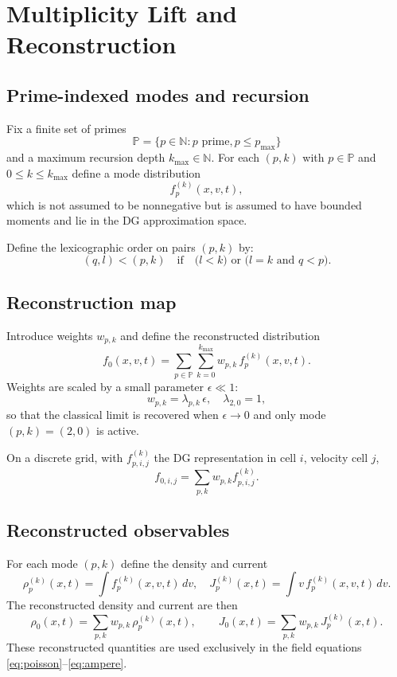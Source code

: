 \documentclass[11pt]{article}
\begin{document}
\section{Multiplicity Lift and Reconstruction}

\subsection{Prime-indexed modes and recursion}

Fix a finite set of primes
\[
  \mathbb{P} = \{p \in \mathbb{N} : p \text{ prime}, p \le p_{\max}\}
\]
and a maximum recursion depth $k_{\max}\in\mathbb{N}$.
For each $(p,k)$ with $p\in\mathbb{P}$ and $0\le k\le k_{\max}$ define a mode
distribution
\[
  f_p^{(k)}(x,v,t),
\]
which is not assumed to be nonnegative but is assumed to have bounded moments
and lie in the DG approximation space.

Define the lexicographic order on pairs $(p,k)$ by:
\[
  (q,l) < (p,k)
  \quad\text{if}\quad
  \big( l < k \big) \text{ or }
  \big( l = k \text{ and } q < p \big).
\]

\subsection{Reconstruction map}

Introduce weights $w_{p,k}$ and define the reconstructed distribution
\begin{equation}
  f_0(x,v,t) = \sum_{p\in\mathbb{P}}\sum_{k=0}^{k_{\max}} w_{p,k}\,
               f_p^{(k)}(x,v,t).
  \label{eq:reconstruction}
\end{equation}
Weights are scaled by a small parameter $\epsilon\ll 1$:
\[
  w_{p,k} = \lambda_{p,k}\,\epsilon,
  \quad
  \lambda_{2,0} = 1,
\]
so that the classical limit is recovered when $\epsilon\to 0$ and only mode
$(p,k)=(2,0)$ is active.

On a discrete grid, with $f_{p,i,j}^{(k)}$ the DG representation in cell $i$,
velocity cell $j$,
\[
  f_{0,i,j} = \sum_{p,k} w_{p,k} f_{p,i,j}^{(k)}.
\]

\subsection{Reconstructed observables}

For each mode $(p,k)$ define the density and current
\[
  \rho_p^{(k)}(x,t) = \int f_p^{(k)}(x,v,t)\,dv,
  \quad
  J_p^{(k)}(x,t) = \int v\,f_p^{(k)}(x,v,t)\,dv.
\]
The reconstructed density and current are then
\begin{equation}
  \rho_0(x,t) = \sum_{p,k} w_{p,k} \,\rho_p^{(k)}(x,t),
  \qquad
  J_0(x,t) = \sum_{p,k} w_{p,k} \,J_p^{(k)}(x,t).
  \label{eq:rho0_J0}
\end{equation}
These reconstructed quantities are used exclusively in the field equations
\eqref{eq:poisson}--\eqref{eq:ampere}.
\end{document}

